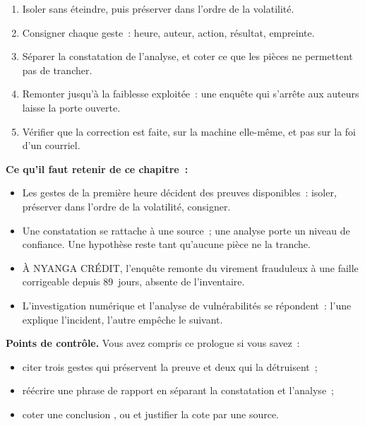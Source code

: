 \begin{enumerate}
    \item Isoler sans éteindre, puis préserver dans l'ordre de la
          volatilité.
    \item Consigner chaque geste~: heure, auteur, action, résultat,
          empreinte.
    \item Séparer la constatation de l'analyse, et coter \NEK{} ce que les
          pièces ne permettent pas de trancher.
    \item Remonter jusqu'à la faiblesse exploitée~: une enquête qui s'arrête
          aux auteurs laisse la porte ouverte.
    \item Vérifier que la correction est faite, sur la machine elle-même, et
          pas sur la foi d'un courriel.
\end{enumerate}

\separateur

\begin{boxresume}
\textbf{Ce qu'il faut retenir de ce chapitre~:}
\begin{itemize}
    \item Les gestes de la première heure décident des preuves
          disponibles~: isoler, préserver dans l'ordre de la volatilité,
          consigner.
    \item Une constatation se rattache à une source~; une analyse porte un
          niveau de confiance. Une hypothèse reste \NEK{} tant qu'aucune
          pièce ne la tranche.
    \item À NYANGA CRÉDIT, l'enquête remonte du virement frauduleux à une
          faille corrigeable depuis 89~jours, absente de l'inventaire.
    \item L'investigation numérique et l'analyse de vulnérabilités se
          répondent~: l'une explique l'incident, l'autre empêche le
          suivant.
\end{itemize}
\end{boxresume}

\begin{boxinfo}
\textbf{Points de contrôle.} Vous avez compris ce prologue si vous savez~:
\begin{itemize}
    \item citer trois gestes qui préservent la preuve et deux qui la
          détruisent~;
    \item réécrire une phrase de rapport en séparant la constatation et
          l'analyse~;
    \item coter une conclusion \OUI{}, \NON{} ou \NEK{} et justifier la
          cote par une source.
\end{itemize}
\end{boxinfo}


